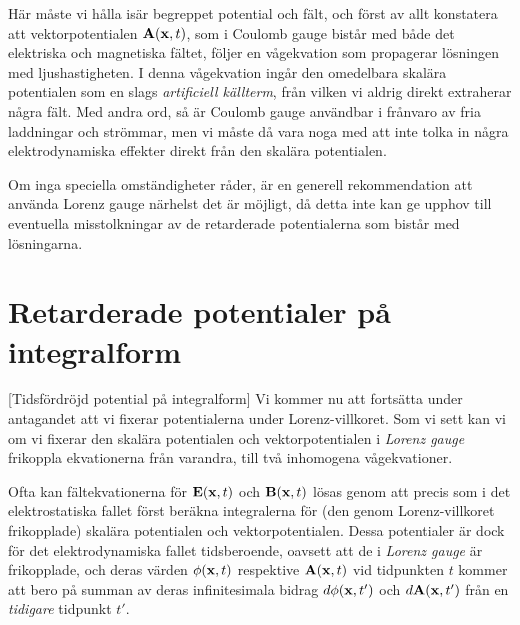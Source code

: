 {{{{{{H{\"a}r m{\aa}ste vi h{\aa}lla is{\"a}r begreppet potential och f{\"a}lt, och
f{\"o}rst av allt konstatera att vektorpotentialen ${\bf A}({\bf x},t)$, som i
Coulomb gauge bist{\aa}r med b{\aa}de det elektriska och magnetiska f{\"a}ltet,
f{\"o}ljer en v{\aa}gekvation som propagerar l{\"o}sningen med ljushastigheten.
I denna v{\aa}gekvation ing{\aa}r den omedelbara skal{\"a}ra potentialen som en
slags {\it artificiell k{\"a}llterm}, fr{\aa}n vilken vi aldrig direkt
extraherar n{\aa}gra f{\"a}lt. Med andra ord, s{\aa} {\"a}r Coulomb gauge
anv{\"a}ndbar i fr{\aa}nvaro av fria laddningar och str{\"o}mmar, men vi
m{\aa}ste d{\aa} vara noga med att inte tolka in n{\aa}gra elektrodynamiska
effekter direkt fr{\aa}n den skal{\"a}ra potentialen.

Om inga speciella omst{\"a}ndigheter r{\aa}der, {\"a}r en generell
rekommendation att anv{\"a}nda Lorenz gauge n{\"a}rhelst det {\"a}r
m{\"o}jligt, d{\aa} detta inte kan ge upphov till eventuella misstolkningar
av de retarderade potentialerna som bist{\aa}r med l{\"o}sningarna.
\vfill\eject

\section{Retarderade potentialer p{\aa} integralform}
[Tidsf{\"o}rdr{\"o}jd potential p{\aa} integralform]
Vi kommer nu att forts{\"a}tta under antagandet att vi fixerar potentialerna
under Lorenz-villkoret. Som vi sett kan vi om vi fixerar den skal{\"a}ra
potentialen och vektorpotentialen i {\it Lorenz gauge} frikoppla ekvationerna
fr{\aa}n varandra, till tv{\aa} inhomogena v{\aa}gekvationer.

Ofta kan f{\"a}ltekvationerna f{\"o}r ${\bf E}({\bf x},t)$ och
${\bf B}({\bf x},t)$ l{\"o}sas genom att precis som i det elektrostatiska
fallet f{\"o}rst ber{\"a}kna integralerna f{\"o}r (den genom Lorenz-villkoret
frikopplade) skal{\"a}ra potentialen och vektorpotentialen. Dessa potentialer
{\"a}r dock f{\"o}r det elektrodynamiska fallet tidsberoende, oavsett att de i
{\it Lorenz gauge} {\"a}r frikopplade, och deras v{\"a}rden $\phi({\bf x},t)$
respektive ${\bf A}({\bf x},t)$ vid tidpunkten $t$ kommer att bero p{\aa}
summan av deras infinitesimala bidrag
$d\phi({\bf x},t')$ och $d{\bf A}({\bf x},t')$ fr{\aa}n en {\it tidigare}
tidpunkt $t'$.

}}}}}}

